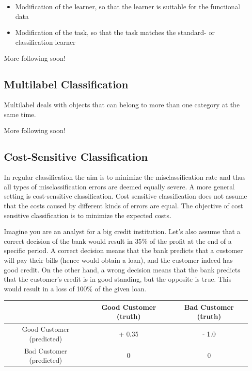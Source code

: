 \documentclass[]{article}
\providecommand{\tightlist}{%
  \setlength{\itemsep}{0pt}\setlength{\parskip}{0pt}}
\begin{document}
\begin{itemize}
\tightlist
\item
  Modification of the learner, so that the learner is suitable for the functional data
\item
  Modification of the task, so that the task matches the standard- or classification-learner
\end{itemize}

More following soon!

\hypertarget{multilabel}{%
\subsection{Multilabel Classification}\label{multilabel}}

Multilabel deals with objects that can belong to more than one category at the same time.

More following soon!

\hypertarget{cost-sens}{%
\subsection{Cost-Sensitive Classification}\label{cost-sens}}

In regular classification the aim is to minimize the misclassification rate and thus all types of misclassification errors are deemed equally severe.
A more general setting is cost-sensitive classification.
Cost sensitive classification does not assume that the costs caused by different kinds of errors are equal.
The objective of cost sensitive classification is to minimize the expected costs.

Imagine you are an analyst for a big credit institution.
Let's also assume that a correct decision of the bank would result in 35\% of the profit at the end of a specific period.
A correct decision means that the bank predicts that a customer will pay their bills (hence would obtain a loan), and the customer indeed has good credit.
On the other hand, a wrong decision means that the bank predicts that the customer's credit is in good standing, but the opposite is true.
This would result in a loss of 100\% of the given loan.

\begin{longtable}[]{@{}ccc@{}}
\toprule
& Good Customer (truth) & Bad Customer (truth)\tabularnewline
\midrule
\endhead
Good Customer (predicted) & + 0.35 & - 1.0\tabularnewline
Bad Customer (predicted) & 0 & 0\tabularnewline
\bottomrule
\end{longtable}
\end{document}
